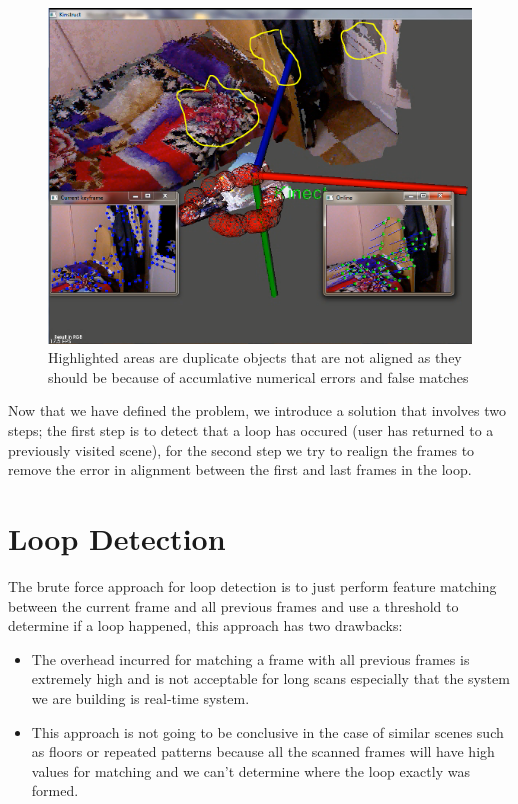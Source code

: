 \begin{figure}[H]
\centering
\includegraphics{Loop/last_frame_loop_highlighted.png}
\caption{Highlighted areas are duplicate objects that are not aligned as they should be because of accumlative numerical errors and false matches}
\label{fig:last_frame_loop_highlighted}
\end{figure}

Now that we have defined the problem, we introduce a solution that involves two steps; the first step is to detect that a loop has occured (user has returned to a previously visited scene), for the second step we try to realign the frames to remove the error in alignment between the first and last frames in the loop.

\pagebreak
\section{Loop Detection}

The brute force approach for loop detection is to just perform feature matching between the current frame and all previous frames and use a threshold to determine if a loop happened, this approach has two drawbacks:

\begin{itemize}
\item The overhead incurred for matching a frame with all previous frames is extremely high and is not acceptable for long scans especially that the system we are building is real-time system. 
\item This approach is not going to be conclusive in the case of similar scenes such as floors or repeated patterns because all the scanned frames will have high values for matching and we can't determine where the loop exactly was formed.
\end{itemize}

